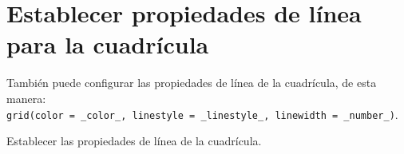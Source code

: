 \section{Establecer propiedades de línea para la cuadrícula}

También puede configurar las propiedades de línea de la cuadrícula, de esta manera:
\texttt{grid(color\ =\ \textquotesingle{}\_color\_\textquotesingle{},\ linestyle\ =\ \textquotesingle{}\_linestyle\_\textquotesingle{},\ linewidth\ =\ \_number\_)}.

\begin{code} Establecer las propiedades de línea de la cuadrícula.

\begin{Shaded}
\begin{Highlighting}[]

\OperatorTok{=}\NormalTok{ np.array([}\NormalTok{, }\NormalTok{, }\NormalTok{, }\NormalTok{, }\NormalTok{, }\NormalTok{, }\NormalTok{, }\NormalTok{, }\NormalTok{, }\NormalTok{])}
\OperatorTok{=}\NormalTok{ np.array([}\NormalTok{, }\NormalTok{, }\NormalTok{, }\NormalTok{, }\NormalTok{, }\NormalTok{, }\NormalTok{, }\NormalTok{, }\NormalTok{, }\NormalTok{])}

\NormalTok{)}
\NormalTok{)}
\NormalTok{)}

\OperatorTok{=} \OperatorTok{=} \StringTok{\textquotesingle{}{-}{-}\textquotesingle{}}\OperatorTok{=} \NormalTok{)}
\end{Highlighting}
\end{Shaded}


\end{code}
